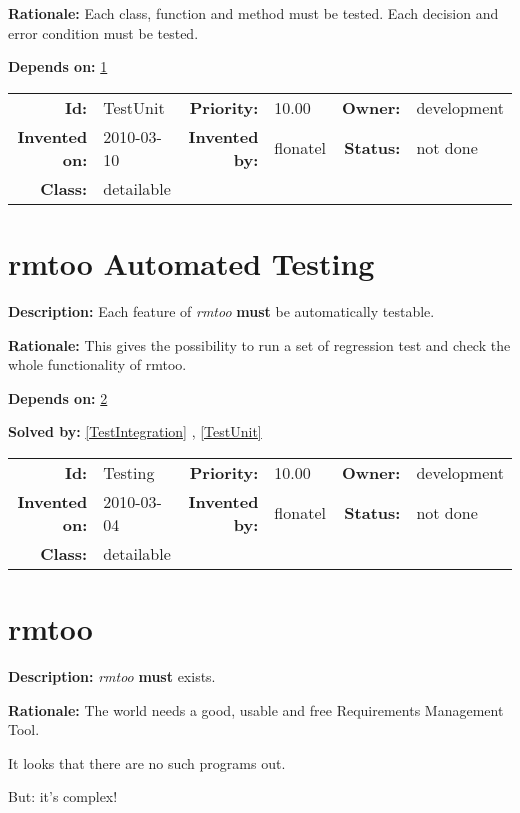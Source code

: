 \textbf{Rationale:} Each class, function and method must be tested.  Each decision and error condition must be tested.

\textbf{Depends on:} \ref{Testing} 

\par
{\small \begin{center}\begin{tabular}{rlrlrl}
\textbf{Id:} & TestUnit  & \textbf{Priority:} & 10.00  & \textbf{Owner:} & development\\ 
\textbf{Invented on:} & 2010-03-10  & \textbf{Invented by:} & flonatel  & \textbf{Status:} & not done \\ 
\textbf{Class:} & detailable  & & & \end{tabular}\end{center} }

\section{rmtoo Automated Testing}\label{Testing}
\textbf{Description:} Each feature of \textsl{rmtoo} \textbf{must} be automatically testable.

\textbf{Rationale:} This gives the possibility to run a set of regression test and check the whole functionality of rmtoo.

\textbf{Depends on:} \ref{rmtoo} 

\textbf{Solved by:} \ref{TestIntegration} , \ref{TestUnit} 

\par
{\small \begin{center}\begin{tabular}{rlrlrl}
\textbf{Id:} & Testing  & \textbf{Priority:} & 10.00  & \textbf{Owner:} & development\\ 
\textbf{Invented on:} & 2010-03-04  & \textbf{Invented by:} & flonatel  & \textbf{Status:} & not done \\ 
\textbf{Class:} & detailable  & & & \end{tabular}\end{center} }

\section{rmtoo}\label{rmtoo}
\textbf{Description:} \textsl{rmtoo} \textbf{must} exists.

\textbf{Rationale:} The world needs a good, usable and free Requirements Management Tool.\par It looks that there are no such programs out.\par But: it's complex! 

